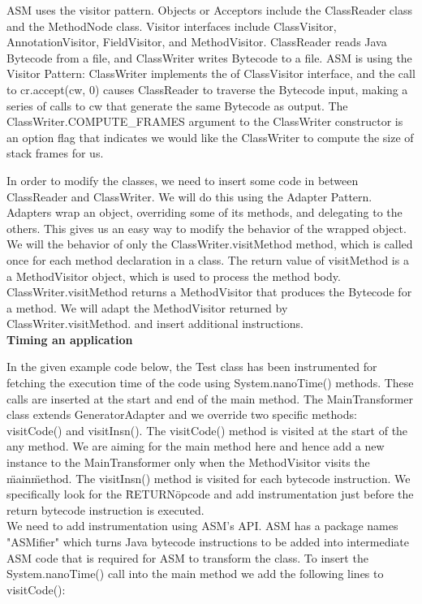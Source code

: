 \documentclass[11pt]{article}
\begin{document}
ASM uses the visitor pattern. Objects or Acceptors include the ClassReader class and the MethodNode class. Visitor interfaces include ClassVisitor, AnnotationVisitor, FieldVisitor, and MethodVisitor.  ClassReader reads Java Bytecode from a file, and ClassWriter writes Bytecode to a file. ASM is using the Visitor Pattern: ClassWriter implements the of ClassVisitor interface, and the call to cr.accept(cw, 0) causes ClassReader to traverse the Bytecode input, making a series of calls to cw that generate the same Bytecode as output. The ClassWriter.COMPUTE\_FRAMES argument to the ClassWriter constructor is an option flag that indicates we would like the ClassWriter to compute the size of stack frames for us. \newline

In order to modify the classes, we need to insert some code in between ClassReader and ClassWriter. We will do this using the Adapter Pattern. Adapters wrap an object, overriding some of its methods, and delegating to the others. This gives us an easy way to modify the behavior of the wrapped object. We will \@override the behavior of only the ClassWriter.visitMethod method, which is called once for each method declaration in a class. The return value of visitMethod is a a MethodVisitor object, which is used to process the method body. ClassWriter.visitMethod returns a MethodVisitor that produces the Bytecode for a method. We will adapt the MethodVisitor returned by ClassWriter.visitMethod. and insert additional instructions.\\

\textbf{Timing an application}\newline

In the given example code below, the Test class has been instrumented for fetching the execution time of the code using System.nanoTime() methods. These calls are inserted at the start and end of the main method. The MainTransformer class extends GeneratorAdapter and we override two specific methods: visitCode() and visitInsn(). The visitCode() method is visited at the start of the any method. We are aiming for the main method here and hence add a new instance to the MainTransformer only when the MethodVisitor visits the \"main\" method. The visitInsn() method is visited for each bytecode instruction. We specifically look for the \"RETURN\" opcode and add instrumentation just before the return bytecode instruction is executed.\\

We need to add instrumentation using ASM's API. ASM has a package names "ASMifier" which turns Java bytecode instructions to be added into intermediate ASM code that is required for ASM to transform the class. To insert the System.nanoTime() call into the main method we add the following lines to visitCode():
\end{document}
